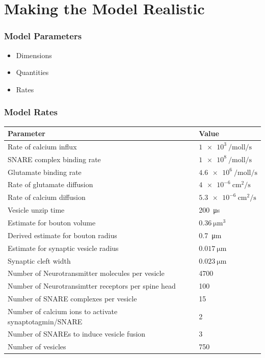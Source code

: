 \documentclass{beamer}
\begin{document}
\section{Making the Model Realistic}
\frame
{
    \frametitle{Model Parameters}
    \begin{itemize}
        \item Dimensions
        \item Quantities
        \item Rates
    \end{itemize}
}

\frame
{
\frametitle{Model Rates}
\begin{table}[H]
\tiny
\begin{tabular}{ll}
Parameter & Value \\ \hline
Rate of calcium influx   &  $\SI{1e3}{\per\mole\litre\per\second}$      \\
SNARE complex binding rate & $\SI{1e8}{\per\mol\litre\per\second}$ \\
Glutamate binding rate & $\SI{4.6e6}{\per\mol\litre\per\second}$ \\
Rate of glutamate diffusion & $\SI{4e-6}{\centi\metre\squared\per\second} $      \\
Rate of calcium diffusion & $\SI{5.3e-6}{\centi\metre\squared\per\second} $      \\
Vesicle unzip time & \SI{200}{\micro\second}  \\
Estimate for bouton volume&  $\SI{0.36}{\micro\meter\cubed}$\\ 
Derived estimate for bouton radius & \SI{0.7}{\micro\meter} \\
Estimate for synaptic vesicle radius & $\SI{0.017}{\micro\meter}$ \\ 
Synaptic cleft width &$\SI{0.023}{\micro\meter}$\\
Number of Neurotransmitter molecules per vesicle & 4700\\
Number of Neurotransimtter receptors per spine head & 100 \\
Number of SNARE complexes per vesicle & 15 \\ 
Number of calcium ions to activate synaptotagmin/SNARE & 2 \\
Number of SNAREs to induce vesicle fusion & 3 \\  
Number of vesicles & 750 \\
\end{tabular}
\end{table}
}


{}
\end{document}
